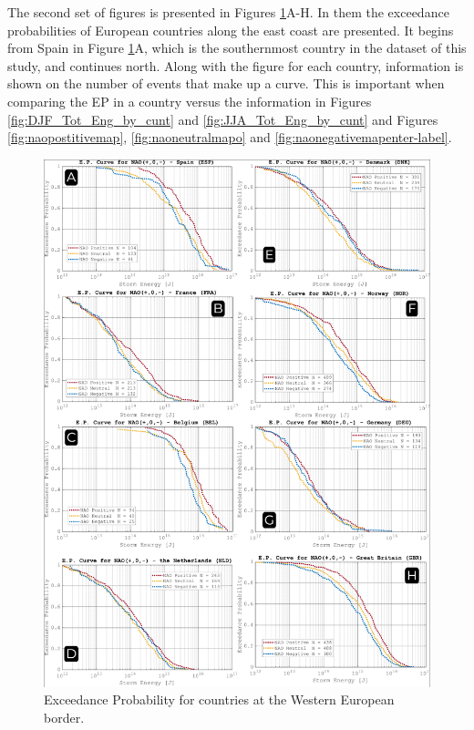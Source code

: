 
    The second set of figures is presented in Figures \ref{fig:epcurvescountry}A-H. In them the exceedance probabilities of European countries along the east coast are presented. It begins from Spain in Figure \ref{fig:epcurvescountry}A, which is the southernmost country in the dataset of this study, and continues north. Along with the figure for each country, information is shown on the number of events that make up a curve. This is important when comparing the EP in a country versus the information in Figures \ref{fig:DJF_Tot_Eng_by_cunt} and \ref{fig:JJA_Tot_Eng_by_cunt} and Figures \ref{fig:naopostitivemap}, \ref{fig:naoneutralmapo} and \ref{fig:naonegativemapenter-label}. 

        \begin{figure}
            \centering
            \includegraphics[width=\textwidth]{figures/epcurvescountry.png}
            \caption{Exceedance Probability for countries at the Western European border.}
            \label{fig:epcurvescountry}
        \end{figure}
    







    
    
    


